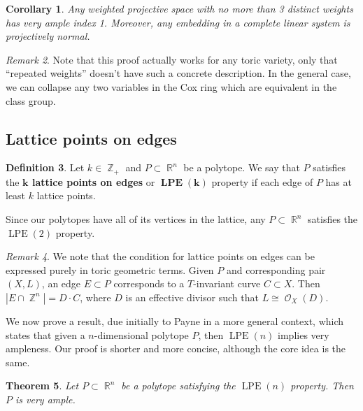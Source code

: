 \documentclass[a4paper,11pt]{amsart}
\theoremstyle{plain}
\newtheorem{theorem}{Theorem}[section]
\newtheorem{corollary}[theorem]{Corollary}
\theoremstyle{definition}
\newtheorem{definition}[theorem]{Definition}
\theoremstyle{remark}
\newtheorem{remark}[theorem]{Remark}
\DeclareMathOperator{\ZZ}{\mathbb{Z}}
\DeclareMathOperator{\RR}{\mathbb{R}}
\DeclareMathOperator{\cO}{\mathcal{O}}
\DeclareMathOperator{\LPE}{LPE}
\begin{document}
\begin{corollary}\label{corollary:3-distinct-weights-VA}
    Any weighted projective space with no more than 3 distinct weights has very ample index 1.
    Moreover, any embedding in a complete linear system is projectively normal.
\end{corollary}

\begin{remark}
    Note that this proof actually works for any toric variety, only that ``repeated weights'' doesn't have such a concrete description.
    In the general case, we can collapse any two variables in the Cox ring which are equivalent in the class group.
\end{remark}

\subsection{Lattice points on edges} \hfill

\begin{definition}
    Let $k \in \ZZ_+$ and $P \subset \RR^n$ be a polytope. We say that $P$ satisfies the \textbf{$\bm{k}$ lattice points on edges} or $\bm{\LPE(k)}$ property if each edge of $P$ has at least $k$ lattice points.
\end{definition}

Since our polytopes have all of its vertices in the lattice, any $P \subset \RR^n$ satisfies the $\LPE(2)$ property.

\begin{remark}
    We note that the condition for lattice points on edges can be expressed purely in toric geometric terms.
    Given $P$ and corresponding pair $(X,L)$, an edge $E \subset P$ corresponds to a $T$-invariant curve $C \subset X$.
    Then $|E \cap \ZZ^n| = D \cdot C$, where $D$ is an effective divisor such that $L \cong \cO_X(D)$.
\end{remark}

We now prove a result, due initially to Payne \cite{Payne:2006} in a more general context, which states that given a $n$-dimensional polytope $P$, then $\LPE(n)$ implies very ampleness. Our proof is shorter and more concise, although the core idea is the same.

\begin{theorem}\label{theorem:Payne-LPE}
Let $P \subset \RR^n$ be a polytope satisfying the $\LPE(n)$ property. Then $P$ is very ample.
\end{theorem}
\end{document}
